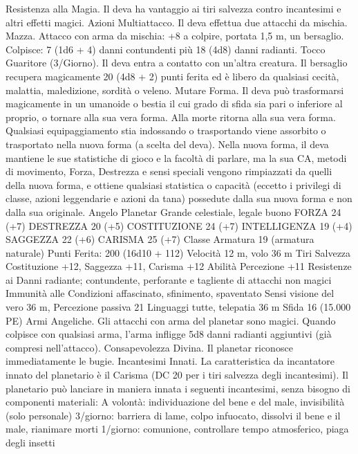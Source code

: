 \begin{multicols}{2}
Resistenza alla Magia. Il deva ha vantaggio ai tiri salvezza
contro incantesimi e altri effetti magici.
Azioni
Multiattacco. Il deva effettua due attacchi da mischia.
Mazza. Attacco con arma da mischia: +8 a colpire, portata 1,5
m, un bersaglio.
Colpisce: 7 (1d6 + 4) danni contundenti più 18 (4d8) danni radianti.
Tocco Guaritore (3/Giorno). Il deva entra a contatto con un’altra
creatura. Il bersaglio recupera magicamente 20 (4d8 + 2) punti
ferita ed è libero da qualsiasi cecità, malattia, maledizione,
sordità o veleno.
Mutare Forma. Il deva può trasformarsi magicamente in un
umanoide o bestia il cui grado di sfida sia pari o inferiore al proprio,
o tornare alla sua vera forma. Alla morte ritorna alla sua vera forma.
Qualsiasi equipaggiamento stia indossando o trasportando viene
assorbito o trasportato nella nuova forma (a scelta del deva).
Nella nuova forma, il deva mantiene le sue statistiche di gioco e la
facoltà di parlare, ma la sua CA, metodi di movimento, Forza,
Destrezza e sensi speciali vengono rimpiazzati da quelli della nuova
forma, e ottiene qualsiasi statistica o capacità (eccetto i privilegi di
classe, azioni leggendarie e azioni da tana) possedute dalla sua nuova
forma e non dalla sua originale.
Angelo Planetar
Grande celestiale, legale buono
FORZA 24 (+7)
DESTREZZA 20 (+5)
COSTITUZIONE 24 (+7)
INTELLIGENZA 19 (+4)
SAGGEZZA 22 (+6)
CARISMA 25 (+7)
Classe Armatura 19 (armatura naturale)
\hspace*{0pt}\hfill{Punti Ferita}: 200 (16d10 + 112)
Velocità 12 m, volo 36 m
Tiri Salvezza Costituzione +12, Saggezza +11, Carisma +12
Abilità Percezione +11
Resistenze ai Danni radiante; contundente, perforante e tagliente
di attacchi non magici
Immunità alle Condizioni affascinato, sfinimento, spaventato
Sensi visione del vero 36 m, Percezione passiva 21
Linguaggi tutte, telepatia 36 m
Sfida 16 (15.000 PE)
Armi Angeliche. Gli attacchi con arma del planetar sono magici.
Quando colpisce con qualsiasi arma, l’arma infligge 5d8 danni
radianti aggiuntivi (già compresi nell’attacco).
Consapevolezza Divina. Il planetar riconosce immediatamente le
bugie.
Incantesimi Innati. La caratteristica da incantatore innato del
planetario è il Carisma (DC 20 per i tiri salvezza degli
incantesimi). Il planetario può lanciare in maniera innata i
seguenti incantesimi, senza bisogno di componenti materiali:
A volontà: individuazione del bene e del male, invisibilità (solo
personale)
3/giorno: barriera di lame, colpo infuocato, dissolvi il bene e il
male, rianimare morti
1/giorno: comunione, controllare tempo atmosferico, piaga degli
insetti

\end{multicols}
